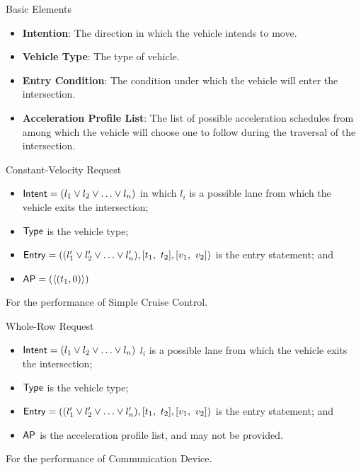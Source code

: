 \documentclass{beamer}
\begin{document}
\begin{frame}{Basic Elements}
\begin{itemize}
\item{\bf Intention}: The direction in which the vehicle intends to
move.\pause
\item{\bf Vehicle Type}: The type of vehicle.\pause
\item{\bf Entry Condition}: The condition under which the vehicle will
enter the intersection.\pause
\item{\bf Acceleration Profile List}: The list of possible
acceleration schedules from among which the vehicle will choose one to
follow during the traversal of the intersection.
\end{itemize}
\end{frame}

\begin{frame}{Constant-Velocity Request}
\begin{itemize}
\item ${\sf Intent} = ( l_1 \vee l_2 \vee \ldots \vee l_n )$
in which $l_i$ is a possible lane from which the vehicle 
exits the intersection;
\item ${\sf Type}$ is the vehicle type;
\item ${\sf Entry} = (( l'_1 \vee l'_2 \vee \ldots \vee l'_n ), [t_1,\ t_2], [v_1,\ v_2])$
is the entry statement; and
\item ${\sf AP} = ( \langle (t_1, 0) \rangle )$
\end{itemize}

For the performance of Simple Cruise Control.
\end{frame}

\begin{frame}{Whole-Row Request}
\begin{itemize}
\item ${\sf Intent} = ( l_1 \vee l_2 \vee \ldots \vee l_n )$ $l_i$ is a possible lane from which the vehicle exits the intersection;
\item ${\sf Type}$ is the vehicle type;
\item ${\sf Entry} = (( l'_1 \vee l'_2 \vee \ldots \vee l'_n ), [t_1,\ t_2], [v_1,\ v_2])$ is the entry statement; and
\item ${\sf AP}$ is the acceleration profile list, and may not be
provided.
\end{itemize}

For the performance of Communication Device.
\end{frame}
\end{document}
